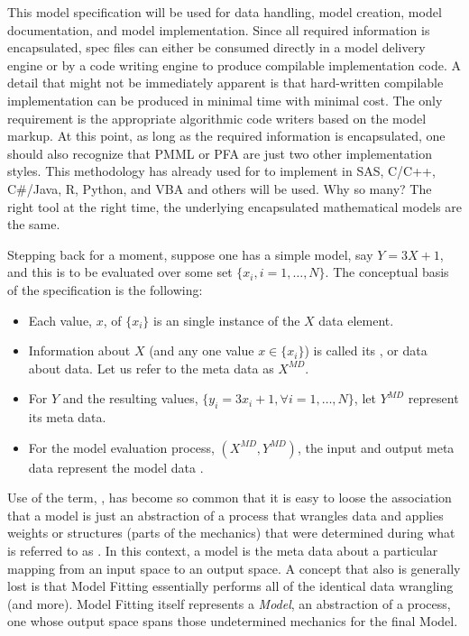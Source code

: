 \documentclass[10pt]{article}
\begin{document}
This model specification will be used for data handling, model creation, model documentation, and model implementation.  Since all required
information is encapsulated, spec files can either be consumed directly in a model delivery engine or by a code writing engine 
to produce compilable implementation code.
A detail that might not be immediately apparent is that hard-written compilable 
implementation can be produced in minimal time with minimal cost.
The only requirement is the appropriate algorithmic code writers based on
the model markup.  At this point, as long as the required information is encapsulated, one should also recognize that PMML or PFA are just two
other implementation styles. This methodology has already 
used for to implement in SAS, C/C++, C\#/Java, R, Python, and VBA
and others will be used.  Why so many?  The right tool at the right time, the underlying encapsulated mathematical models are the same.

Stepping back for a moment, suppose one has a simple model, say $Y = 3X +1$, and this is to be evaluated over some set $\{x_i, i=1,\ldots,N\}$.  
The conceptual basis of the specification is the following:
    \begin{itemize}[label=-,noitemsep,topsep=0pt]
        \item Each value, $x$, of $\{x_i\}$ is an single instance of the $X$ data element.
        \item Information about $X$ (and any one value $x\in \{x_i\}$) is called its , or data about data. Let us refer to 
            the meta data as $X^{MD}$.
        \item For $Y$ and the resulting values, $\{y_i=3x_i+1, \forall i=1,\ldots,N\}$, let $Y^{MD}$ represent its meta data.
        \item For the model evaluation process, $(X^{MD}, Y^{MD})$, the input and output meta data represent the model data .
    \end{itemize}
Use of the term, , has become so common that it is easy to loose the association that a model is just an abstraction of a
process that wrangles data and applies weights or structures (parts of the mechanics) 
that were determined during what is referred to as .
In this context, a model is the meta data about a particular mapping from an input space to an output space.
A concept that also is generally lost is that Model Fitting essentially performs all of the identical data wrangling (and more).  Model Fitting 
itself represents a {\em Model}, an abstraction of a process, one whose output space spans those undetermined mechanics for the final Model.  
\end{document}

